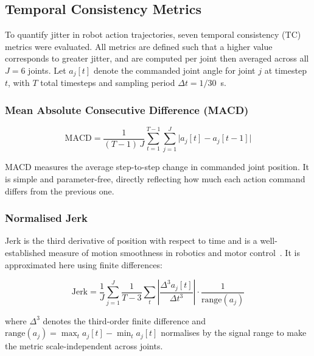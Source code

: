 
\subsection{Temporal Consistency Metrics}

To quantify jitter in robot action trajectories, seven temporal consistency (TC)
metrics were evaluated. All metrics are defined such that a higher value
corresponds to greater jitter, and are computed per joint then averaged across
all $J = 6$ joints. Let $a_j[t]$ denote the commanded joint angle for joint $j$
at timestep $t$, with $T$ total timesteps and sampling period $\Delta t =
1/30$~s.

\subsubsection{Mean Absolute Consecutive Difference (MACD)}

\begin{equation}
    \text{MACD} = \frac{1}{(T-1)\,J}
    \sum_{t=1}^{T-1} \sum_{j=1}^{J} \bigl|a_j[t] - a_j[t-1]\bigr|
    \label{eq:macd}
\end{equation}

MACD measures the average step-to-step change in commanded joint position. It is
simple and parameter-free, directly reflecting how much each action command
differs from the previous one.

\subsubsection{Normalised Jerk}

Jerk is the third derivative of position with respect to time and is a
well-established measure of motion smoothness in robotics and motor
control~\cite{flash1985coordination}. It is approximated here using finite
differences:

\begin{equation}
    \text{Jerk} = \frac{1}{J} \sum_{j=1}^{J}
    \frac{1}{T-3} \sum_{t} \left|
        \frac{\Delta^3 a_j[t]}{\Delta t^3}
    \right| \cdot \frac{1}{\mathrm{range}(a_j)}
    \label{eq:jerk}
\end{equation}

where $\Delta^3$ denotes the third-order finite difference and
$\mathrm{range}(a_j) = \max_t a_j[t] - \min_t a_j[t]$ normalises by the
signal range to make the metric scale-independent across joints.

